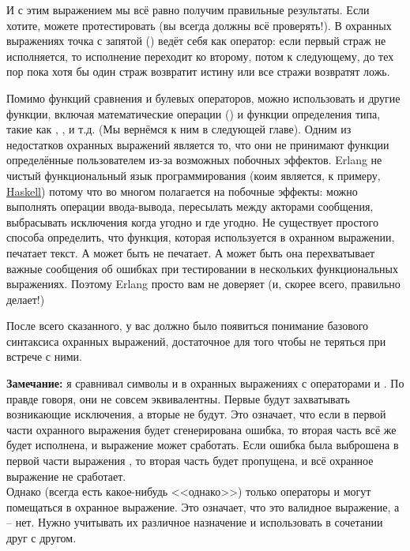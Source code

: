 И с этим выражением мы всё равно получим правильные результаты. Если хотите, можете протестировать (вы всегда должны всё проверять!). В охранных выражениях точка с запятой (\ops{;}) ведёт себя как оператор: если первый страж не исполняется, то исполнение переходит ко второму, потом к следующему, до тех пор пока хотя бы один страж возвратит истину или все стражи возвратят ложь.

Помимо функций сравнения и булевых операторов, можно использовать и другие функции, включая математические операции () и функции определения типа, такие как , , и т.д. (Мы вернёмся к ним в следующей главе). Одним из недостатков охранных выражений является то, что они не принимают функции определённые пользователем из\--за возможных побочных эффектов. Erlang не чистый функциональный язык программирования (коим является, к примеру, \href{http://learnyouahaskell.com}{Haskell}) потому что во многом полагается на побочные эффекты: можно выполнять операции ввода\--вывода, пересылать между акторами сообщения, выбрасывать исключения когда угодно и где угодно. Не существует простого способа определить, что функция, которая используется в охранном выражении, печатает текст. А может быть не печатает. А может быть она перехватывает важные сообщения об ошибках при тестировании в нескольких функциональных выражениях. Поэтому Erlang просто вам не доверяет (и, скорее всего, правильно делает!)

    После всего сказанного, у вас должно было появиться понимание базового синтаксиса охранных выражений, достаточное для того чтобы не теряться при встрече с ними.\\
\colorbox{lgray}
{
    \begin{minipage}{\linewidth}
        \textbf{Замечание:} я сравнивал символы \ops{,} и \ops{;} в охранных выражениях с операторами  и . По правде говоря, они не совсем эквивалентны. Первые будут захватывать возникающие исключения, а вторые не будут. Это означает, что если в первой части охранного выражения  будет сгенерирована ошибка, то вторая часть всё же будет исполнена, и выражение может сработать. Если ошибка была выброшена в первой части выражения , то вторая часть будет пропущена, и всё охранное выражение не сработает.\\ 
        Однако (всегда есть какое\--нибудь <<однако>>) только операторы  и  могут помещаться в охранное выражение. Это означает, что  это валидное выражение, а  \--- нет. Нужно учитывать их различное назначение и использовать в сочетании друг с другом.
    \end{minipage}
}

